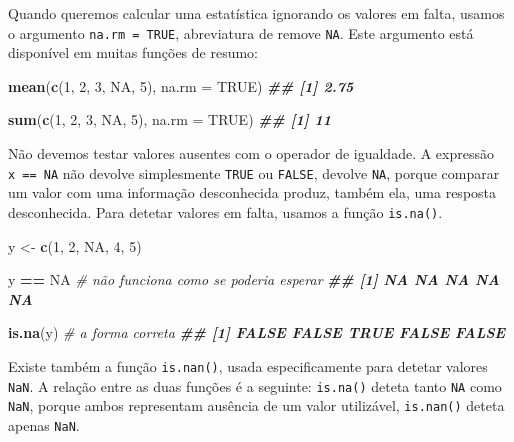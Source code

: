 \documentclass[
  portuguese,
  11pt,
  openany]{book}
\newenvironment{Shaded}{\begin{snugshade}}{\end{snugshade}}
\newcommand{\AttributeTok}[1]{\textcolor[rgb]{0.13,0.29,0.53}{#1}}
\newcommand{\CommentTok}[1]{\textcolor[rgb]{0.56,0.35,0.01}{\textit{#1}}}
\newcommand{\ConstantTok}[1]{\textcolor[rgb]{0.56,0.35,0.01}{#1}}
\newcommand{\DecValTok}[1]{\textcolor[rgb]{0.00,0.00,0.81}{#1}}
\newcommand{\DocumentationTok}[1]{\textcolor[rgb]{0.56,0.35,0.01}{\textbf{\textit{#1}}}}
\newcommand{\FunctionTok}[1]{\textcolor[rgb]{0.13,0.29,0.53}{\textbf{#1}}}
\newcommand{\NormalTok}[1]{#1}
\newcommand{\OtherTok}[1]{\textcolor[rgb]{0.56,0.35,0.01}{#1}}
\newcommand{\SpecialCharTok}[1]{\textcolor[rgb]{0.81,0.36,0.00}{\textbf{#1}}}
\begin{document}
Quando queremos calcular uma estatística ignorando os valores em falta, usamos o argumento \texttt{na.rm\ =\ TRUE}, abreviatura de remove \texttt{NA}. Este argumento está disponível em muitas funções de resumo:

\begin{Shaded}
\begin{Highlighting}[]
\FunctionTok{mean}\NormalTok{(}\FunctionTok{c}\NormalTok{(}\DecValTok{1}\NormalTok{, }\DecValTok{2}\NormalTok{, }\DecValTok{3}\NormalTok{, }\ConstantTok{NA}\NormalTok{, }\DecValTok{5}\NormalTok{), }\AttributeTok{na.rm =} \ConstantTok{TRUE}\NormalTok{)}
\DocumentationTok{\#\# [1] 2.75}

\FunctionTok{sum}\NormalTok{(}\FunctionTok{c}\NormalTok{(}\DecValTok{1}\NormalTok{, }\DecValTok{2}\NormalTok{, }\DecValTok{3}\NormalTok{, }\ConstantTok{NA}\NormalTok{, }\DecValTok{5}\NormalTok{), }\AttributeTok{na.rm =} \ConstantTok{TRUE}\NormalTok{)}
\DocumentationTok{\#\# [1] 11}
\end{Highlighting}
\end{Shaded}

Não devemos testar valores ausentes com o operador de igualdade. A expressão \texttt{x\ ==\ NA} não devolve simplesmente \texttt{TRUE} ou \texttt{FALSE}, devolve \texttt{NA}, porque comparar um valor com uma informação desconhecida produz, também ela, uma resposta desconhecida. Para detetar valores em falta, usamos a função \texttt{is.na()}.

\begin{Shaded}
\begin{Highlighting}[]
\NormalTok{y }\OtherTok{\textless{}{-}} \FunctionTok{c}\NormalTok{(}\DecValTok{1}\NormalTok{, }\DecValTok{2}\NormalTok{, }\ConstantTok{NA}\NormalTok{, }\DecValTok{4}\NormalTok{, }\DecValTok{5}\NormalTok{)}

\NormalTok{y }\SpecialCharTok{==} \ConstantTok{NA}        \CommentTok{\# não funciona como se poderia esperar}
\DocumentationTok{\#\# [1] NA NA NA NA NA}

\FunctionTok{is.na}\NormalTok{(y)       }\CommentTok{\# a forma correta}
\DocumentationTok{\#\# [1] FALSE FALSE  TRUE FALSE FALSE}
\end{Highlighting}
\end{Shaded}

Existe também a função \texttt{is.nan()}, usada especificamente para detetar valores \texttt{NaN}. A relação entre as duas funções é a seguinte: \texttt{is.na()} deteta tanto \texttt{NA} como \texttt{NaN}, porque ambos representam ausência de um valor utilizável, \texttt{is.nan()} deteta apenas \texttt{NaN}.
\end{document}
